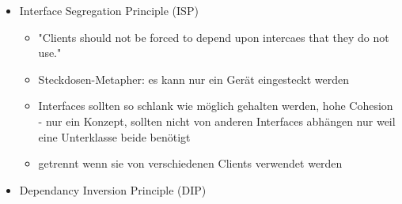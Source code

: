 \documentclass[paper=a4, fontsize=11pt]{scrartcl} %
\numberwithin{equation}{section} %
\numberwithin{figure}{section} %
\numberwithin{table}{section} %
\begin{document}
\begin{itemize}
\begin{itemize}
\begin{itemize}
\begin{minipage}{.5\textwidth}
      \end{minipage}
      \item Interface Segregation Principle (ISP)
      \begin{itemize}
        \item "Clients should not be forced to depend upon intercaes that they do not use."
        \item Steckdosen-Metapher: es kann nur ein Gerät eingesteckt werden
        \item Interfaces sollten so schlank wie möglich gehalten werden, hohe Cohesion - nur ein Konzept, sollten nicht von anderen Interfaces abhängen nur weil eine Unterklasse beide benötigt
        \item getrennt wenn sie von verschiedenen Clients verwendet werden
      \end{itemize}
      \item Dependancy Inversion Principle (DIP)
\end{itemize}
\end{itemize}
\end{itemize}
\end{document}
